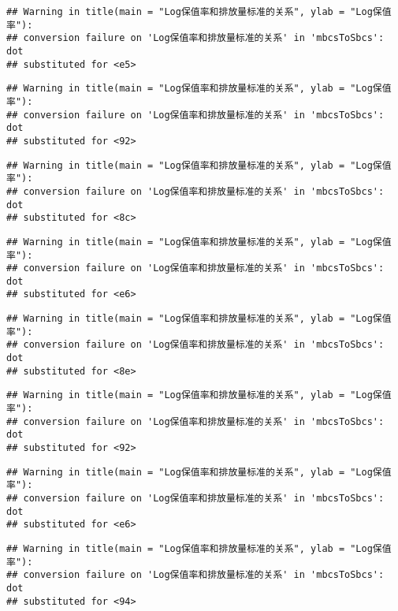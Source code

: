 \documentclass[]{article}
\begin{document}
\begin{verbatim}
## Warning in title(main = "Log保值率和排放量标准的关系", ylab = "Log保值率"):
## conversion failure on 'Log保值率和排放量标准的关系' in 'mbcsToSbcs': dot
## substituted for <e5>
\end{verbatim}

\begin{verbatim}
## Warning in title(main = "Log保值率和排放量标准的关系", ylab = "Log保值率"):
## conversion failure on 'Log保值率和排放量标准的关系' in 'mbcsToSbcs': dot
## substituted for <92>
\end{verbatim}

\begin{verbatim}
## Warning in title(main = "Log保值率和排放量标准的关系", ylab = "Log保值率"):
## conversion failure on 'Log保值率和排放量标准的关系' in 'mbcsToSbcs': dot
## substituted for <8c>
\end{verbatim}

\begin{verbatim}
## Warning in title(main = "Log保值率和排放量标准的关系", ylab = "Log保值率"):
## conversion failure on 'Log保值率和排放量标准的关系' in 'mbcsToSbcs': dot
## substituted for <e6>
\end{verbatim}

\begin{verbatim}
## Warning in title(main = "Log保值率和排放量标准的关系", ylab = "Log保值率"):
## conversion failure on 'Log保值率和排放量标准的关系' in 'mbcsToSbcs': dot
## substituted for <8e>
\end{verbatim}

\begin{verbatim}
## Warning in title(main = "Log保值率和排放量标准的关系", ylab = "Log保值率"):
## conversion failure on 'Log保值率和排放量标准的关系' in 'mbcsToSbcs': dot
## substituted for <92>
\end{verbatim}

\begin{verbatim}
## Warning in title(main = "Log保值率和排放量标准的关系", ylab = "Log保值率"):
## conversion failure on 'Log保值率和排放量标准的关系' in 'mbcsToSbcs': dot
## substituted for <e6>
\end{verbatim}

\begin{verbatim}
## Warning in title(main = "Log保值率和排放量标准的关系", ylab = "Log保值率"):
## conversion failure on 'Log保值率和排放量标准的关系' in 'mbcsToSbcs': dot
## substituted for <94>
\end{verbatim}
\end{document}

